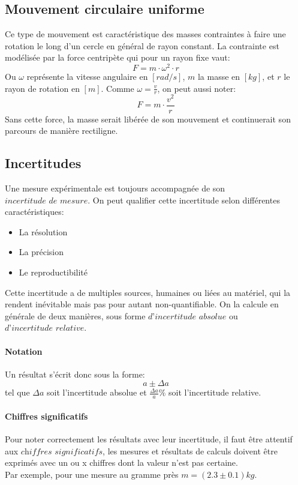 \subsection{Mouvement circulaire uniforme}
Ce type de mouvement est caractéristique des masses contraintes à faire une rotation le long d'un cercle en général de rayon constant.
La contrainte est modélisée par la force centripète qui pour un rayon fixe vaut:
\begin{equation}
    F=m\cdot \omega^2 \cdot r
\end{equation}
Ou $\omega$ représente la vitesse angulaire en $[rad/s]$, $m$ la masse en $[kg]$, et $r$ le rayon de rotation en $[m]$.
Comme $\omega=\frac{v}{r}$, on peut aussi noter:
\begin{equation}
    F=m\cdot\frac{v^2}{r}
\end{equation}
Sans cette force, la masse serait libérée de son mouvement et continuerait son parcours de manière rectiligne.

\subsection{Incertitudes}

Une mesure expérimentale est toujours accompagnée de son $\textit{incertitude de mesure}$. On peut qualifier cette incertitude selon différentes caractéristiques:
\begin{itemize}
\item La résolution
\item La précision
\item Le reproductibilité
\end{itemize}

Cette incertitude a de multiples sources, humaines ou liées au matériel, qui la rendent inévitable mais pas pour autant non-quantifiable.
On la calcule en générale de deux manières, sous forme $\textit{d'incertitude absolue}$ ou $\textit{d'incertitude relative}$.

\paragraph{Notation}
Un résultat s'écrit donc sous la forme: \[a\pm\Delta a\] tel que $\Delta a$ soit l'incertitude absolue et $\frac{\Delta a}{a} \%$ soit l'incertitude relative.

\paragraph{Chiffres significatifs}
Pour noter correctement les résultats avec leur incertitude, il faut être attentif aux $\textit{chiffres significatifs}$, les mesures et résultats de calculs doivent être exprimés avec un ou x chiffres dont la valeur n'est pas certaine.\\
Par exemple, pour une mesure au gramme près $m = (2.3\pm0.1)kg$.

